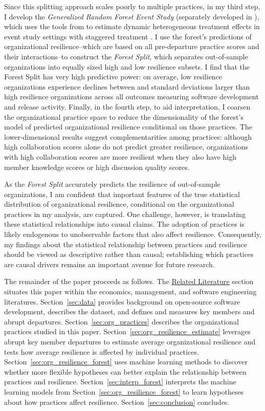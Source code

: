 \documentclass[12pt,notitlepage]{article}
\begin{document}
Since this splitting approach scales poorly to multiple practices, in my third step, I develop the \textit{Generalized Random Forest Event Study} (separately developed in \citealt{liao_generalized_2025}), which uses the tools from \cite{athey_generalized_2019} to estimate dynamic heterogeneous treatment effects in event study settings with staggered treatment \citep{sun_estimating_2021}. 
I use the forest’s predictions of organizational resilience--which are based on all pre-departure practice scores and their interactions--to construct the \textit{Forest Split}, which separates out-of-sample organizations into equally sized high  and low resilience subsets. 
I find that the Forest Split has very high predictive power: on average, low resilience organizations experience declines between \AvgMinDecline{} and \AvgMaxDecline{} standard deviations larger than high resilience organizations across all outcomes measuring software development and release activity.
Finally, in the fourth step, to aid interpretation, I coarsen the organizational practice space to reduce the dimensionality of the forest's model of predicted organizational resilience conditional on those practices.
The lower-dimensional results suggest complementarities among practices: although high collaboration scores alone do not predict greater resilience, organizations with high collaboration scores are more resilient when they also have high member knowledge scores or high discussion quality scores. 

As the \textit{Forest Split} accurately predicts the resilience of out-of-sample organizations, I am confident that important features of the true statistical distribution of organizational resilience, conditional on the organizational practices in my analysis, are captured. 
One challenge, however, is translating these statistical relationships into causal claims. 
The adoption of practices is likely endogenous to unobservable factors that also affect resilience.
Consequently, my findings about the statistical relationship between practices and resilience should be viewed as descriptive rather than causal; establishing which practices are causal drivers remains an important avenue for future research. 

The remainder of the paper proceeds as follows. 
The \hyperref[sec:literature]{Related Literature} section situates this paper within the economics, management, and software engineering literatures. 
Section~\ref{sec:data} provides background on open-source software development, describes the dataset, and defines and measures key members and abrupt departures.
Section~\ref{sec:org_practices} describes the organizational practices studied in this paper.
Section~\ref{sec:org_resilience_estimate} leverages abrupt key member departures to estimate average organizational resilience and tests how average resilience is affected by individual practices. 
Section~\ref{sec:org_resilience_forest} uses machine learning methods to discover whether more flexible hypotheses can better explain the relationship between practices and resilience.
Section~\ref{sec:interp_forest} interprets the machine learning models from Section~\ref{sec:org_resilience_forest} to learn hypotheses about how practices affect resilience. 
Section~\ref{sec:conclusion} concludes.
\end{document}
